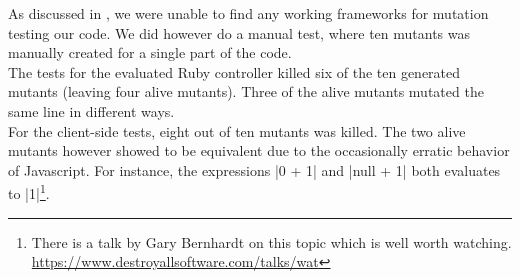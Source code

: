 \MakeShortVerb{\|}

As discussed in , we were unable to find any working
frameworks for mutation testing our code. We did however do a manual
test, where ten mutants was manually created for a single part of the
code.\\

The tests for the evaluated Ruby controller killed six of the ten
generated mutants (leaving four alive mutants). Three of the alive
mutants mutated the same line in different ways.\\

For the client-side tests, eight out of ten mutants was killed. The two
alive mutants however showed to be equivalent due to the occasionally
erratic behavior of Javascript. For instance, the expressions |0 + 1|
and |null + 1| both evaluates to |1|\footnote{There is a talk by Gary
Bernhardt on this topic which is well worth watching.
\url{https://www.destroyallsoftware.com/talks/wat}}.\\
